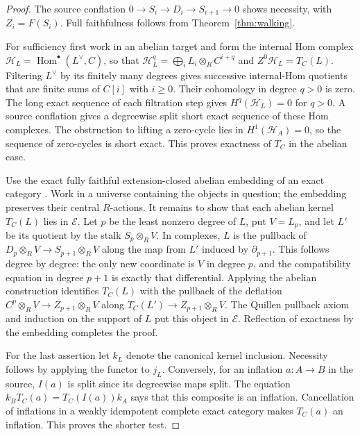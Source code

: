 \documentclass[11pt,a4paper]{article}
\theoremstyle{definition}
\begin{document}
\begin{proof}
The source conflation $0\to S_i\to D_i\to S_{i+1}\to0$
shows necessity, with $Z_i=F(S_i)$. Full faithfulness follows from
Theorem~\ref{thm:walking}.

For sufficiency first work in an abelian target and form the internal
Hom complex $\mathcal H_L=\operatorname{Hom}^{\bullet}(L^\vee,C)$,
so that $\mathcal H_L^q=\bigoplus_i L_i\otimes_R C^{i+q}$ and
$Z^0\mathcal H_L=T_C(L)$. Filtering $L^\vee$ by its finitely many
degrees gives successive internal-Hom quotients that are finite
sums of $C[i]$ with $i\ge0$. Their cohomology in degree $q>0$
is zero. The long exact sequence of each filtration step gives
$H^q(\mathcal H_L)=0$ for $q>0$. A source conflation gives a
degreewise split short exact sequence of these Hom complexes.
The obstruction to lifting a zero-cycle lies in
$H^1(\mathcal H_A)=0$, so the sequence of zero-cycles is short
exact. This proves exactness of $T_C$ in the abelian case.

Use the exact fully faithful extension-closed abelian embedding of
an exact category \cite[Theorem~A.1, p.~36]{Buehler}. Work in a universe
containing the objects in question; the embedding preserves their
central $R$-actions. It remains to show that each abelian kernel
$T_C(L)$ lies in $\mathcal E$. Let $p$ be the least nonzero degree
of $L$, put $V=L_p$, and let $L'$ be its quotient by the stalk
$S_p\otimes_R V$. In complexes, $L$ is the pullback of
$D_p\otimes_RV\to S_{p+1}\otimes_RV$ along the map from $L'$
induced by $\partial_{p+1}$. This follows degree by degree: the
only new coordinate is $V$ in degree $p$, and the compatibility
equation in degree $p+1$ is exactly that differential. Applying
the abelian construction identifies $T_C(L)$ with the pullback of
the deflation $C^p\otimes_RV\to Z_{p+1}\otimes_RV$ along
$T_C(L')\to Z_{p+1}\otimes_RV$. The Quillen pullback axiom and
induction on the support of $L$ put this object in $\mathcal E$.
Reflection of exactness by the embedding completes the proof.

For the last assertion let $k_L$ denote the canonical kernel
inclusion. Necessity follows by applying the functor to $j_L$.
Conversely, for an inflation $a:A\to B$ in the source, $I(a)$
is split since its degreewise maps split. The equation
$k_BT_C(a)=T_C(I(a))k_A$ says that this composite is an inflation.
Cancellation of inflations in a weakly idempotent complete exact
category \cite[dual of Proposition~7.5, p.~17]{Buehler} makes $T_C(a)$
an inflation. This proves the shorter test.
\end{proof}
\end{document}
